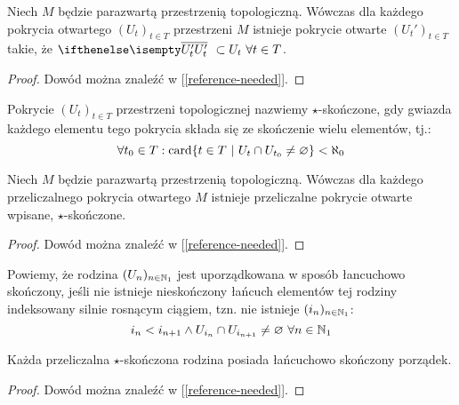 \begin{lem} \label{lem:cl-refinement}
  Niech $M$ będzie parazwartą przestrzenią topologiczną. Wówczas dla każdego pokrycia otwartego $(U_t)_{t \in T}$ przestrzeni $M$ istnieje pokrycie otwarte $(U_t')_{t \in T}$ takie, że $\cl{U_t'}\ \subset U_t\ \forall t \in T$.
  \begin{proof}
    Dowód można znaleźć w [\ref{reference-needed}].
  \end{proof}
\end{lem}

\begin{df}
  Pokrycie $(U_t)_{t \in T}$ przestrzeni topologicznej nazwiemy $\star$-skończone, gdy gwiazda każdego elementu tego pokrycia składa się ze skończenie wielu elementów, tj.:
  \[
    \forall t_0 \in T: \operatorname{card}\{t \in T\ |\ U_t \cap U_{t_0} \neq \varnothing\} < \aleph_0
  \]

\end{df}


\begin{lem} \label{lem:star-finite}
  Niech $M$ będzie parazwartą przestrzenią topologiczną. Wówczas dla każdego przeliczalnego pokrycia otwartego $M$ istnieje przeliczalne pokrycie otwarte wpisane, $\star$-skończone.
  \begin{proof}
    Dowód można znaleźć w [\ref{reference-needed}].
  \end{proof}
\end{lem}

\begin{df}
  Powiemy, że rodzina $(U_n)_{n\in\mathbb{N}_1}$ jest uporządkowana w sposób łancuchowo skończony, jeśli nie istnieje nieskończony łańcuch elementów tej rodziny indeksowany silnie rosnącym ciągiem, tzn. nie istnieje $(i_n)_{n\in\mathbb{N}_1}$:
  \[
    i_n < i_{n+1} \wedge U_{i_n} \cap U_{i_{n+1}} \neq \varnothing\ \forall n\in\mathbb{N}_1
  \]
\end{df}

\begin{lem} \label{lem:chain-finite-order}
  Każda przeliczalna $\star$-skończona rodzina posiada łańcuchowo skończony porządek.
  \begin{proof}
    Dowód można znaleźć w [\ref{reference-needed}].
  \end{proof}
\end{lem}
